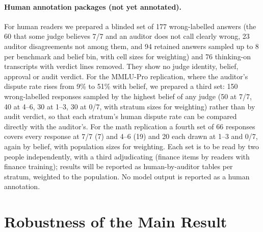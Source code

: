 \documentclass[11pt]{article}
\begin{document}
\paragraph{Human annotation packages (not yet annotated).} For human readers we prepared a blinded set of 177
wrong-labelled answers (the 60 that some judge believes 7/7 and an auditor does not call clearly wrong, 23 auditor
disagreements not among them, and 94 retained answers sampled up to 8 per benchmark and belief bin, with cell sizes
for weighting) and 76 thinking-on transcripts with verdict lines removed. They show no judge identity, belief,
approval or audit verdict. For the MMLU-Pro replication, where the auditor's dispute rate rises from 9\% to 51\%
with belief, we prepared a third set: 150 wrong-labelled responses sampled by the highest belief of any judge (50 at
7/7, 40 at 4--6, 30 at 1--3, 30 at 0/7, with stratum sizes for weighting) rather than by audit verdict, so that each
stratum's human dispute rate can be compared directly with the auditor's. For the math replication a fourth set of
66 responses covers every response at 7/7 (7) and 4--6 (19) and 20 each drawn at 1--3 and 0/7, again by belief, with
population sizes for weighting. Each set is to be read by two people independently, with a third adjudicating
(finance items by readers with finance training); results will be reported as human-by-auditor tables per stratum,
weighted to the population. No model output is reported as a human annotation.

\section{Robustness of the Main Result}
\label{app:robust}
\end{document}
